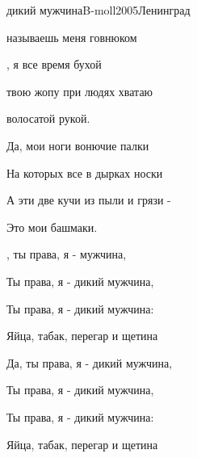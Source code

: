 \begin{song}{дикий мужчина}{B-moll}{2005}{Ленинград}{}{}

  \begin{SBVerse}
     называешь меня говнюком

    , я все время бухой

     твою жопу при людях хватаю

     волосатой рукой.
  \end{SBVerse}

  \begin{SBVerse}
    Да, мои ноги вонючие палки

    На которых все в дырках носки

    А эти две кучи из пыли и грязи -

    Это мои башмаки.
  \end{SBVerse}

  \begin{SBChorus}
    , ты права, я -  мужчина,

    Ты права, я - дикий мужчина,

    Ты права, я - дикий мужчина:

    Яйца, табак, перегар и щетина
  \end{SBChorus}

  \begin{SBChorus}
    Да, ты права, я - дикий мужчина,

    Ты права, я - дикий мужчина,

    Ты права, я - дикий мужчина:

    Яйца, табак, перегар и щетина
  \end{SBChorus}
\end{song}
